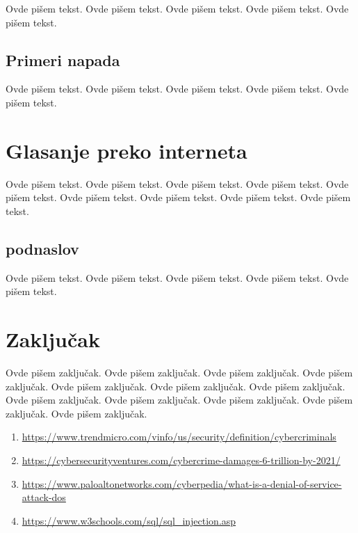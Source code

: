 \documentclass[a4paper]{article}
\begin{document}
Ovde pišem tekst. 
Ovde pišem tekst. 
Ovde pišem tekst. 
Ovde pišem tekst. 
Ovde pišem tekst. 

\subsection{Primeri napada}
\label{subsec:primeri_napada}

Ovde pišem tekst. 
Ovde pišem tekst. 
Ovde pišem tekst. 
Ovde pišem tekst. 
Ovde pišem tekst. 


\section{Glasanje preko interneta}
\label{sec:glasanje}

Ovde pišem tekst. 
Ovde pišem tekst. 
Ovde pišem tekst. 
Ovde pišem tekst. 
Ovde pišem tekst. 
Ovde pišem tekst. 
Ovde pišem tekst. 
Ovde pišem tekst. 
Ovde pišem tekst. 

\subsection{podnaslov}
\label{subsec:podnaslov}

Ovde pišem tekst. 
Ovde pišem tekst. 
Ovde pišem tekst. 
Ovde pišem tekst. 
Ovde pišem tekst.

\section{Zaključak}
\label{sec:zakljucak}

Ovde pišem zaključak. 
Ovde pišem zaključak. 
Ovde pišem zaključak. 
Ovde pišem zaključak. 
Ovde pišem zaključak. 
Ovde pišem zaključak. 
Ovde pišem zaključak. 
Ovde pišem zaključak. 
Ovde pišem zaključak. 
Ovde pišem zaključak. 
Ovde pišem zaključak. 
Ovde pišem zaključak.

 

\appendix
 

\begin{enumerate}
\item \url{https://www.trendmicro.com/vinfo/us/security/definition/cybercriminals}
\item \url{https://cybersecurityventures.com/cybercrime-damages-6-trillion-by-2021/} 
\item \url{https://www.paloaltonetworks.com/cyberpedia/what-is-a-denial-of-service-attack-dos}
\item \url{https://www.w3schools.com/sql/sql_injection.asp}
\end{enumerate}
\end{document}
